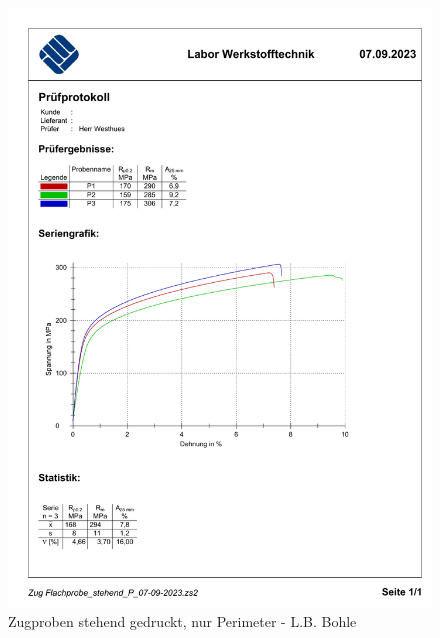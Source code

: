   \begin{figure}[ht]
    \centering
    \includegraphics[width=1\textwidth]{bilder/Zug Flachprobe_stehend_P.pdf}
    \caption{Zugproben stehend gedruckt, nur Perimeter - L.B. Bohle}
    \label{ZugprobenP}
  \end{figure}
  
